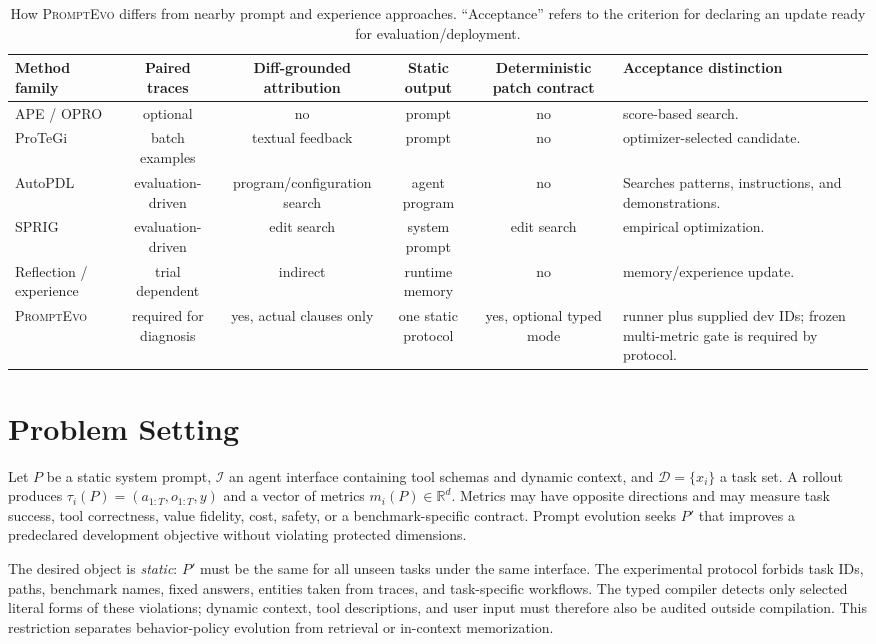 \documentclass[10pt]{article}
\newcommand{\method}{\textsc{PromptEvo}}
\begin{document}
\begin{table}[t]
\centering
\caption{How \method{} differs from nearby prompt and experience approaches. ``Acceptance'' refers to the criterion for declaring an update ready for evaluation/deployment.}
\label{tab:positioning}
\small
\begin{tabular}{p{2.6cm}ccccp{5.1cm}}
\toprule
Method family & Paired traces & Diff-grounded attribution & Static output & Deterministic patch contract & Acceptance distinction \\
\midrule
APE / OPRO \cite{ape,opro} & optional & no & prompt & no & score-based search. \\
ProTeGi \cite{protegi} & batch examples & textual feedback & prompt & no & optimizer-selected candidate. \\
AutoPDL \cite{autopdl} & evaluation-driven & program/configuration search & agent program & no & Searches patterns, instructions, and demonstrations. \\
SPRIG \cite{sprig} & evaluation-driven & edit search & system prompt & edit search & empirical optimization. \\
Reflection / experience \cite{reflexion,expel} & trial dependent & indirect & runtime memory & no & memory/experience update. \\
\method{} & required for diagnosis & yes, actual clauses only & one static protocol & yes, optional typed mode & runner plus supplied dev IDs; frozen multi-metric gate is required by protocol. \\
\bottomrule
\end{tabular}
\end{table}

\section{Problem Setting}
Let $P$ be a static system prompt, $\mathcal{I}$ an agent interface containing tool schemas and dynamic context, and $\mathcal{D}=\{x_i\}$ a task set. A rollout produces $\tau_i(P)=(a_{1:T},o_{1:T},y)$ and a vector of metrics $m_i(P)\in\mathbb{R}^d$. Metrics may have opposite directions and may measure task success, tool correctness, value fidelity, cost, safety, or a benchmark-specific contract. Prompt evolution seeks $P'$ that improves a predeclared development objective without violating protected dimensions.

The desired object is \emph{static}: $P'$ must be the same for all unseen tasks under the same interface. The experimental protocol forbids task IDs, paths, benchmark names, fixed answers, entities taken from traces, and task-specific workflows. The typed compiler detects only selected literal forms of these violations; dynamic context, tool descriptions, and user input must therefore also be audited outside compilation. This restriction separates behavior-policy evolution from retrieval or in-context memorization.
\end{document}

